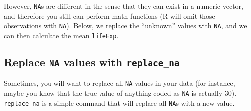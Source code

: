 \documentclass[]{book}
\newenvironment{Shaded}{\begin{snugshade}}{\end{snugshade}}
\newcommand{\KeywordTok}[1]{\textcolor[rgb]{0.13,0.29,0.53}{\textbf{#1}}}
\newcommand{\DataTypeTok}[1]{\textcolor[rgb]{0.13,0.29,0.53}{#1}}
\newcommand{\DecValTok}[1]{\textcolor[rgb]{0.00,0.00,0.81}{#1}}
\newcommand{\StringTok}[1]{\textcolor[rgb]{0.31,0.60,0.02}{#1}}
\newcommand{\CommentTok}[1]{\textcolor[rgb]{0.56,0.35,0.01}{\textit{#1}}}
\newcommand{\OtherTok}[1]{\textcolor[rgb]{0.56,0.35,0.01}{#1}}
\newcommand{\OperatorTok}[1]{\textcolor[rgb]{0.81,0.36,0.00}{\textbf{#1}}}
\newcommand{\NormalTok}[1]{#1}
\begin{document}
However, \texttt{NA}s are different in the sense that they can exist in
a numeric vector, and therefore you still can perform math functions (R
will omit those observations with \texttt{NA}). Below, we replace the
``unknown'' values with \texttt{NA}, and we can then calculate the mean
\texttt{lifeExp}.

\begin{Shaded}
\end{Shaded}

\subsection{\texorpdfstring{Replace \texttt{NA} values with
\texttt{replace\_na}}{Replace NA values with replace\_na}}\label{replace-na-values-with-replace_na}

Sometimes, you will want to replace all \texttt{NA} values in your data
(for instance, maybe you know that the true value of anything coded as
\texttt{NA} is actually 30). \texttt{replace\_na} is a simple command
that will replace all \texttt{NA}s with a new value.

\begin{Shaded}
\end{Shaded}
\end{document}
